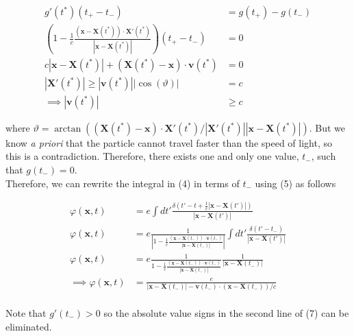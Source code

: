 \documentclass{article}
\begin{document}
\begin{equation}
\begin{split}
g'(t^*) ( t_+ - t_- ) & = g( t_+ ) - g( t_-) \\
\left(1 - \frac{1}{c} \frac{ (  \bm{x} - \bm{X}(t^*))\cdot \bm{X}'(t^*)  }{ | \bm{x} -  \bm{X} (  t^*) |  } \right)  ( t_+ - t_- )   & =  0 \\
c| \bm{x} -  \bm{X} (  t^*) | + ( \bm{X}(t^*)- \bm{x} )\cdot \bm{v}(t^*)  & = 0 \\
 | \bm{X}'(t^*) | \ge | \bm{v}(t^*) | | \cos(\vartheta) | & = c \\
\implies | \bm{v}(t^*) | & \ge c
\end{split}
\end{equation}

where $\vartheta = \arctan( ( \bm{X}(t^*)- \bm{x} )\cdot \bm{X}'(t^*)/ | \bm{X}'(t^*) |  | \bm{x} -  \bm{X} (  t^*) | )$. But we know {\it a priori} that the particle cannot travel faster than the speed of light, so this is a contradiction. Therefore, there exists one and only one value, $t_-$, such that $g(t_-) = 0$. \\

Therefore, we can rewrite the integral in (4) in terms of $t_-$ using (5) as follows

\begin{equation}
\begin{split}
\varphi( \bm{x}, t) & = e  \int  dt' \frac{   \delta \left(  t'  - t +  \frac{1}{c}| \bm{x} -  \bm{X} \left(  t'    \right) | \right)    }{|\bm{x} -  \bm{X} \left(  t'    \right)|}    \\
\varphi( \bm{x}, t) & = e \frac{1}{| 1 - \frac{1}{c} \frac{ ( \bm{x} - \bm{X}(t_-) )\cdot \bm{v}(t_-)  }{ | \bm{x} -  \bm{X} (  t_-) |  } |} \int  dt' \frac{   \delta \left(  t'  - t_- \right)    }{ |\bm{x} -  \bm{X} \left(  t'    \right)| }    \\
\varphi( \bm{x}, t) & = e \frac{1}{1 - \frac{1}{c} \frac{ ( \bm{x} - \bm{X}(t_-) )\cdot \bm{v}(t_-)  }{ | \bm{x} -  \bm{X} (  t_-) |  } } \frac{  1  }{ |\bm{x} -  \bm{X} \left(  t_-   \right)| }    \\
\implies \varphi( \bm{x}, t) & =  \frac{e}{|\bm{x} -  \bm{X} \left(  t_-   \right)|  - \bm{v}(t_-) \cdot ( \bm{x} - \bm{X}(t_-) )/c }   \\
\end{split}
\end{equation}

Note that $g'(t_-)>0$ so the absolute value signs in the second line of (7) can be eliminated. 
\end{document}
